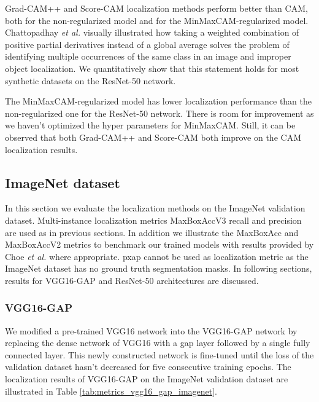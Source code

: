 Grad-CAM++ and Score-CAM localization methods perform better than CAM, both for the non-regularized model and for the MinMaxCAM-regularized model. Chattopadhay \textit{et al.} \cite{chattopadhyay2017grad} visually illustrated how taking a weighted combination of positive partial derivatives instead of a global average solves the problem of identifying multiple occurrences of the same class in an image and improper object localization. We quantitatively show that this statement holds for most synthetic datasets on the ResNet-50 network.

The MinMaxCAM-regularized model has lower localization performance than the non-regularized one for the ResNet-50 network. There is room for improvement as we haven't optimized the hyper parameters for MinMaxCAM. Still, it can be observed that both Grad-CAM++ and Score-CAM both improve on the CAM localization results.

\subsection{ImageNet dataset}
In this section we evaluate the localization methods on the ImageNet validation dataset. Multi-instance localization metrics MaxBoxAccV3 recall and precision are used as in previous sections. In addition we illustrate the MaxBoxAcc and MaxBoxAccV2 metrics to benchmark our trained models with results provided by Choe \textit{et al.} \cite{choe2020evaluating} where appropriate. \acrfull{pxap} cannot be used as localization metric as the ImageNet dataset has no ground truth segmentation masks. In following sections, results for VGG16-GAP and ResNet-50 architectures are discussed.

\subsubsection{VGG16-GAP}
We modified a pre-trained VGG16 network into the VGG16-GAP network by replacing the dense network of VGG16 with a \acrshort{gap} layer followed by a single fully connected layer. This newly constructed network is fine-tuned until the loss of the validation dataset hasn't decreased for five consecutive training epochs. The localization results of VGG16-GAP on the ImageNet validation dataset are illustrated in Table \ref{tab:metrics_vgg16_gap_imagenet}.

